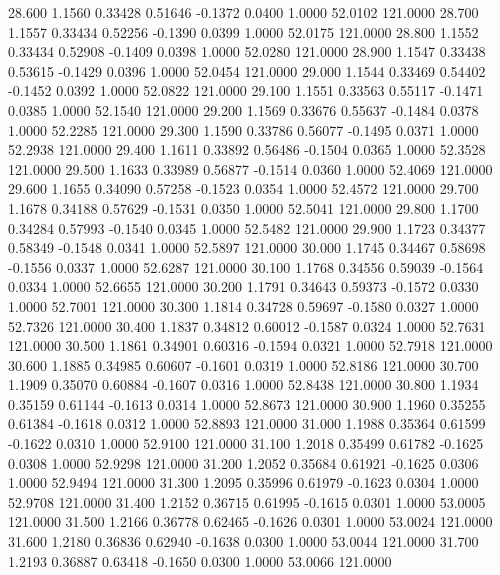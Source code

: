  28.600   1.1560   0.33428   0.51646  -0.1372   0.0400   1.0000  52.0102 121.0000
  28.700   1.1557   0.33434   0.52256  -0.1390   0.0399   1.0000  52.0175 121.0000
  28.800   1.1552   0.33434   0.52908  -0.1409   0.0398   1.0000  52.0280 121.0000
  28.900   1.1547   0.33438   0.53615  -0.1429   0.0396   1.0000  52.0454 121.0000
  29.000   1.1544   0.33469   0.54402  -0.1452   0.0392   1.0000  52.0822 121.0000
  29.100   1.1551   0.33563   0.55117  -0.1471   0.0385   1.0000  52.1540 121.0000
  29.200   1.1569   0.33676   0.55637  -0.1484   0.0378   1.0000  52.2285 121.0000
  29.300   1.1590   0.33786   0.56077  -0.1495   0.0371   1.0000  52.2938 121.0000
  29.400   1.1611   0.33892   0.56486  -0.1504   0.0365   1.0000  52.3528 121.0000
  29.500   1.1633   0.33989   0.56877  -0.1514   0.0360   1.0000  52.4069 121.0000
  29.600   1.1655   0.34090   0.57258  -0.1523   0.0354   1.0000  52.4572 121.0000
  29.700   1.1678   0.34188   0.57629  -0.1531   0.0350   1.0000  52.5041 121.0000
  29.800   1.1700   0.34284   0.57993  -0.1540   0.0345   1.0000  52.5482 121.0000
  29.900   1.1723   0.34377   0.58349  -0.1548   0.0341   1.0000  52.5897 121.0000
  30.000   1.1745   0.34467   0.58698  -0.1556   0.0337   1.0000  52.6287 121.0000
  30.100   1.1768   0.34556   0.59039  -0.1564   0.0334   1.0000  52.6655 121.0000
  30.200   1.1791   0.34643   0.59373  -0.1572   0.0330   1.0000  52.7001 121.0000
  30.300   1.1814   0.34728   0.59697  -0.1580   0.0327   1.0000  52.7326 121.0000
  30.400   1.1837   0.34812   0.60012  -0.1587   0.0324   1.0000  52.7631 121.0000
  30.500   1.1861   0.34901   0.60316  -0.1594   0.0321   1.0000  52.7918 121.0000
  30.600   1.1885   0.34985   0.60607  -0.1601   0.0319   1.0000  52.8186 121.0000
  30.700   1.1909   0.35070   0.60884  -0.1607   0.0316   1.0000  52.8438 121.0000
  30.800   1.1934   0.35159   0.61144  -0.1613   0.0314   1.0000  52.8673 121.0000
  30.900   1.1960   0.35255   0.61384  -0.1618   0.0312   1.0000  52.8893 121.0000
  31.000   1.1988   0.35364   0.61599  -0.1622   0.0310   1.0000  52.9100 121.0000
  31.100   1.2018   0.35499   0.61782  -0.1625   0.0308   1.0000  52.9298 121.0000
  31.200   1.2052   0.35684   0.61921  -0.1625   0.0306   1.0000  52.9494 121.0000
  31.300   1.2095   0.35996   0.61979  -0.1623   0.0304   1.0000  52.9708 121.0000
  31.400   1.2152   0.36715   0.61995  -0.1615   0.0301   1.0000  53.0005 121.0000
  31.500   1.2166   0.36778   0.62465  -0.1626   0.0301   1.0000  53.0024 121.0000
  31.600   1.2180   0.36836   0.62940  -0.1638   0.0300   1.0000  53.0044 121.0000
  31.700   1.2193   0.36887   0.63418  -0.1650   0.0300   1.0000  53.0066 121.0000
